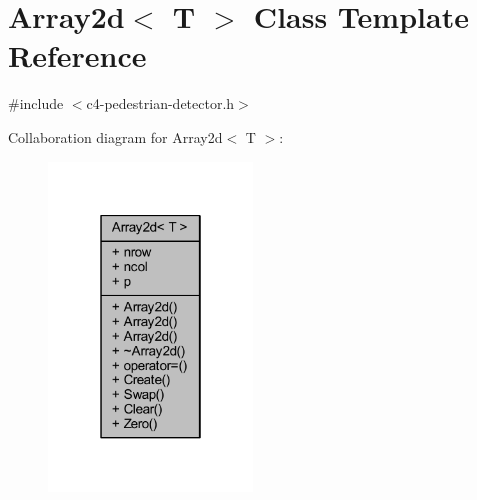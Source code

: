 \hypertarget{class_array2d}{}\section{Array2d$<$ T $>$ Class Template Reference}
\label{class_array2d}


{\ttfamily \#include $<$c4-\/pedestrian-\/detector.\+h$>$}



Collaboration diagram for Array2d$<$ T $>$\+:\nopagebreak
\begin{figure}[H]
\begin{center}
\leavevmode
\includegraphics[width=154pt]{class_array2d__coll__graph}
\end{center}
\end{figure}
